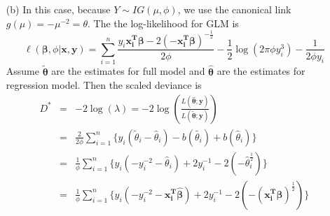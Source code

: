 \documentclass[]{article}
\begin{document}
\begin{enumerate}
{\begin{itemize}
        	\item[(b)]
        	In this case,  because $Y\sim IG(\mu,\phi)$, we use the canonical link $g(\mu) = -\mu^{-2} = \theta$. The the log-likelihood for GLM is 
        	\begin{equation}
        	\ell(\bm \beta, \phi| \bm x, \bm y ) = \sum_{i=1}^{n}\frac{y_i\bm{x_i^T}\bm\beta - 2 (-\bm{x_i^T}\bm{\beta})^{-\frac{1}{2}}}{2\phi} - \frac{1}{2}\log(2\pi\phi y_i^3) - \frac{1}{2\phi y_i}
        	\end{equation}
        	Assume $\tilde{\bm\theta}$ are the estimates  for full model and $\hat{\bm{\theta}}$ are the estimates for regression model. Then the scaled deviance is 
        	\begin{eqnarray}
        	D^* & = & -2\log(\lambda) = -2 \log(\frac{L(\hat{\bm{\theta}};\bm y)}{L(\tilde{\bm \theta};\bm y)})\\
        	& = & \frac{2}{2\phi}\sum_{i = 1}^{n}\{y_i(\tilde{\theta}_i - \hat{\theta}_i) - b(\tilde{\theta_i}) + b(\hat{\theta}_i)\}\\
            & = & \frac{1}{\phi}\sum_{i = 1}^{n}\{y_i(-y_i^{-2}-\hat{\theta}_i) + 2 y_i^{-1} -2(-\hat{\theta}_i^{\frac{1}{2}}) \} \\       	
            & = &
            \frac{1}{\phi}\sum_{i = 1}^{n}\{y_i(-y_i^{-2}-\bm{x_i^T}\hat{\bm\beta}) + 2 y_i^{-1} -2(-(\bm{x_i^T}\hat{\bm\beta})^{\frac{1}{2}}) \}
        	\end{eqnarray} 
        \end{itemize}
}

\end{enumerate}
\end{document}
